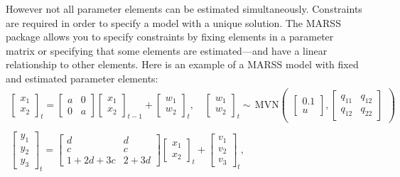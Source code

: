 \documentclass[12pt,]{book}
\begin{document}
However not all parameter elements can be estimated simultaneously. Constraints are required in order to specify a model with a unique solution. The MARSS package allows you to specify constraints by fixing elements in a parameter matrix or specifying that some elements are estimated---and have a linear relationship to other elements. Here is an example of a MARSS model with fixed and estimated parameter elements:
\begin{gather*}
\begin{bmatrix}x_1\\ x_2\end{bmatrix}_t
= \begin{bmatrix}a&0\\0&a\end{bmatrix}
\begin{bmatrix}x_1\\x_2\end{bmatrix}_{t-1}
+ \begin{bmatrix}w_1\\ w_2\end{bmatrix}_t,\quad 
\begin{bmatrix}w_1\\ w_2\end{bmatrix}_t \sim \,\text{MVN}\begin{pmatrix}\begin{bmatrix}0.1\\u\end{bmatrix},\begin{bmatrix}q_{11}&q_{12}\\q_{12}&q_{22}\end{bmatrix} \end{pmatrix}  \\
\\
\begin{bmatrix}y_1\\ y_2\\ y_3\end{bmatrix}_t
= \begin{bmatrix}d&d\\ c& c\\ 1+2d+3c&2+3d\end{bmatrix}
\begin{bmatrix}x_1\\ x_2\end{bmatrix}_t
+ \begin{bmatrix}v_1\\ v_2\\ v_3\end{bmatrix}_t,\quad

\end{gather*}
\end{document}
